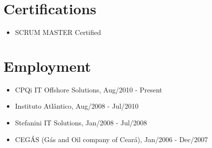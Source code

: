 \documentclass[letterpaper]{article}
\begin{document}
\section*{Certifications}
\begin{itemize}
  \item SCRUM MASTER Certified
\end{itemize}

\section*{Employment}

\begin{itemize}
\item CPQi IT Offshore Solutions, Aug/2010 - Present
\item Instituto Atlântico, Aug/2008 - Jul/2010
\item Stefanini IT Solutions, Jan/2008 - Jul/2008
\item CEGÁS (Gás and Oil company of Ceará), Jan/2006 - Dec/2007
\end{itemize}
\end{document}
